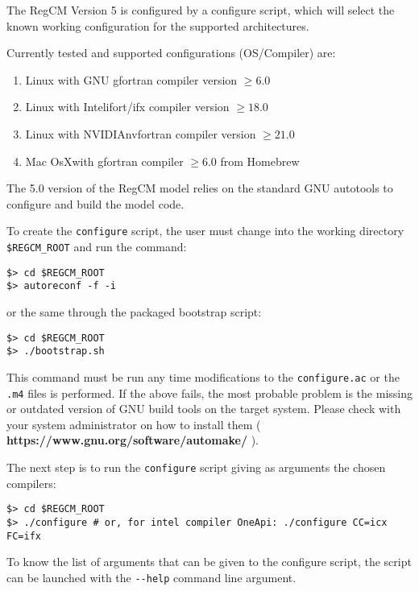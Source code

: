 The RegCM Version 5 is configured by a configure script, which will select
the known working configuration for the supported architectures.

Currently tested and supported configurations (OS/Compiler) are:

\begin{enumerate}
\item Linux with GNU gfortran compiler version $\ge 6.0$
\item Linux with Intel\texttrademark ifort/ifx compiler version $\ge 18.0$
\item Linux with NVIDIA\texttrademark nvfortran compiler version $\ge 21.0$
\item Mac OsX\texttrademark with gfortran compiler $\ge 6.0$ from Homebrew
\end{enumerate}

The 5.0 version of the RegCM model relies on the standard GNU autotools to
configure and build the model code.

To create the \verb=configure= script, the user must change into the 
working directory \verb=$REGCM_ROOT= and run the command:

\begin{Verbatim}
$> cd $REGCM_ROOT
$> autoreconf -f -i
\end{Verbatim}

or the same through the packaged bootstrap script:

\begin{Verbatim}
$> cd $REGCM_ROOT
$> ./bootstrap.sh
\end{Verbatim}

This command must be run any time modifications to the \verb=configure.ac= or
the \verb=.m4= files is performed.
If the above fails, the most probable problem is the missing or outdated
version of GNU build tools on the target system. Please check with your
system administrator on how to install them
({ \bf https://www.gnu.org/software/automake/ }).

The next step is to run the \verb=configure= script giving as arguments the
chosen compilers:

\begin{Verbatim}
$> cd $REGCM_ROOT
$> ./configure # or, for intel compiler OneApi: ./configure CC=icx FC=ifx
\end{Verbatim}

To know the list of arguments that can be given to the configure script, the
script can be launched with the \verb=--help= command line argument.

